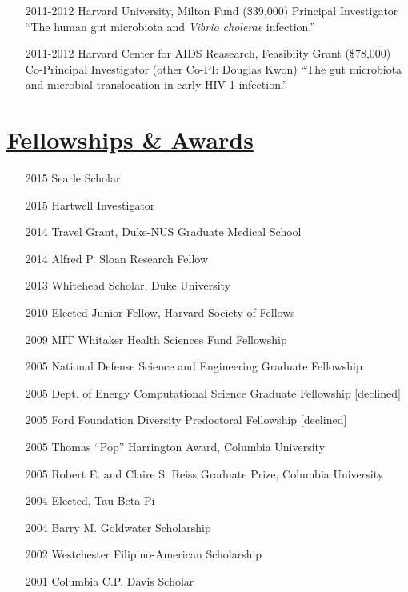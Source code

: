 \documentclass[overlapped,line,11pt]{res}
\begin{document}
\begin{resume}
\begin{itemize}[leftmargin=2cm, style=sameline]
\item[2011-2012] Harvard University, Milton Fund (\$39,000) \newline
  Principal Investigator \newline ``The human gut microbiota
  and \emph{Vibrio cholerae} infection.''

\item[2011-2012] Harvard Center for AIDS Reasearch, Feasibiity Grant (\$78,000) \newline
  Co-Principal Investigator (other Co-PI: Douglas Kwon) \newline ``The gut microbiota and microbial
translocation in early HIV-1 infection.''

\end{itemize}

\section{\underline{\sc Fellowships \& Awards}} 
\vspace{.25in}

\begin{itemize}[leftmargin=1cm, style=sameline, itemsep=0mm]
\item[2015] Searle Scholar
\item[2015] Hartwell Investigator
\item[2014] Travel Grant, Duke-NUS Graduate Medical School
\item[2014] Alfred P. Sloan Research Fellow %
\item[2013] Whitehead Scholar, Duke University%
\item[2010] Elected Junior Fellow, Harvard Society of Fellows%
\item[2009] MIT Whitaker Health Sciences Fund Fellowship %
\item[2005] National Defense Science and Engineering Graduate
  Fellowship
\item[2005] Dept. of Energy Computational Science Graduate Fellowship [declined]
\item[2005] Ford Foundation Diversity Predoctoral Fellowship [declined]
\item[2005] Thomas ``Pop'' Harrington Award, Columbia University
\item[2005] Robert E. and Claire S. Reiss Graduate Prize, Columbia University
\item[2004] Elected, Tau Beta Pi
\item[2004] Barry M. Goldwater Scholarship
\item[2002] Westchester Filipino-American Scholarship
\item[2001] Columbia C.P. Davis Scholar


\end{itemize}
\end{resume}
\end{document}

